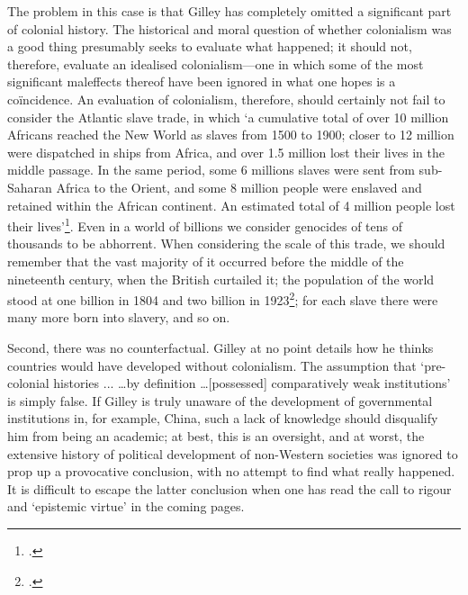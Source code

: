 \begin{multicols}{2}
The problem in this case is that Gilley has completely omitted a significant part of colonial history. The historical and moral question of whether colonialism was a good thing presumably seeks to evaluate what happened; it should not, therefore, evaluate an idealised colonialism---one in which some of the most significant maleffects thereof have been ignored in what one hopes is a coïncidence. An evaluation of colonialism, therefore, should certainly not fail to consider the Atlantic slave trade, in which `a cumulative total of over 10 million Africans reached the New World as slaves from 1500 to 1900; closer to 12 million were dispatched in ships from Africa, and over 1.5 million lost their lives in the middle passage. In the same period, some 6 millions slaves were sent from sub-Saharan Africa to the Orient, and some 8 million people were enslaved and retained within the African continent. An estimated total of 4 million people lost their lives'\footcite{slavery}. Even in a world of billions we consider genocides of tens of thousands to be abhorrent. When considering the scale of this trade, we should remember that the vast majority of it occurred before the middle of the nineteenth century, when the British curtailed it; the population of the world stood at one billion in 1804 and two billion in 1923\footcite{pop}; for each slave there were many more born into slavery, and so on.

Second, there was no counterfactual. Gilley at no point details how he thinks countries would have developed without colonialism. The assumption that `pre-colonial histories ... \ldots by definition \ldots [possessed] comparatively weak institutions' is simply false. If Gilley is truly unaware of the development of governmental institutions in, for example, China, such a lack of knowledge should disqualify him from being an academic; at best, this is an oversight, and at worst, the extensive history of political development of non-Western societies was ignored to prop up a provocative conclusion, with no attempt to find what really happened. It is difficult to escape the latter conclusion when one has read the call to rigour and `epistemic virtue' in the coming pages.


\end{multicols}
